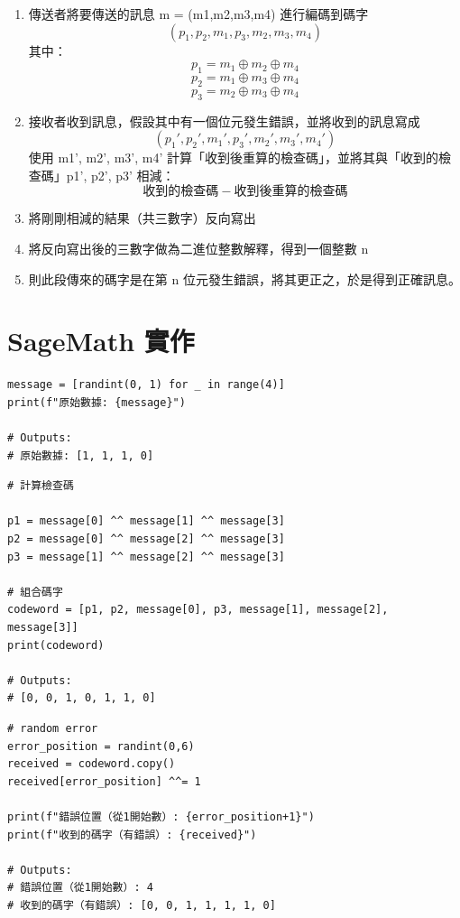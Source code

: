\documentclass[
]{article}
\providecommand{\tightlist}{%
  \setlength{\itemsep}{0pt}\setlength{\parskip}{0pt}}
\begin{document}
\begin{enumerate}
\def\labelenumi{\arabic{enumi}.}
\setcounter{enumi}{-1}
\tightlist
\item
  傳送者將要傳送的訊息 m = (m1,m2,m3,m4) 進行編碼到碼字 \[
  (p_{1},p_{2},m_{1},p_{3},m_{2},m_{3},m_{4})
  \] 其中： \[
  p_{1} = m_{1}\oplus m_{2}\oplus m_{4}
  \] \[
  p_{2} = m_{1}\oplus m_{3}\oplus m_{4}
  \] \[
  p_{3} = m_{2}\oplus m_{3}\oplus m_{4}
  \]
\item
  接收者收到訊息，假設其中有一個位元發生錯誤，並將收到的訊息寫成 \[
  (p_{1}',p_{2}',m_{1}',p_{3}',m_{2}',m_{3}',m_{4}')
  \] 使用 m1', m2', m3', m4'
  計算「收到後重算的檢查碼」，並將其與「收到的檢查碼」p1', p2', p3'
  相減： \[
  收到的檢查碼 - 收到後重算的檢查碼 
  \]
\item
  將剛剛相減的結果（共三數字）反向寫出
\item
  將反向寫出後的三數字做為二進位整數解釋，得到一個整數 n
\item
  則此段傳來的碼字是在第 n 位元發生錯誤，將其更正之，於是得到正確訊息。
\end{enumerate}

\hypertarget{sagemath-ux5be6ux4f5c}{%
\section{SageMath 實作}\label{sagemath-ux5be6ux4f5c}}

\begin{verbatim}
message = [randint(0, 1) for _ in range(4)]
print(f"原始數據: {message}")
 
# Outputs:
# 原始數據: [1, 1, 1, 0]
\end{verbatim}

\begin{verbatim}
# 計算檢查碼

p1 = message[0] ^^ message[1] ^^ message[3]
p2 = message[0] ^^ message[2] ^^ message[3]
p3 = message[1] ^^ message[2] ^^ message[3]

# 組合碼字
codeword = [p1, p2, message[0], p3, message[1], message[2], message[3]]
print(codeword)

# Outputs:
# [0, 0, 1, 0, 1, 1, 0]
\end{verbatim}

\begin{verbatim}
# random error
error_position = randint(0,6)
received = codeword.copy()
received[error_position] ^^= 1

print(f"錯誤位置（從1開始數）: {error_position+1}")
print(f"收到的碼字（有錯誤）: {received}")

# Outputs:
# 錯誤位置（從1開始數）: 4
# 收到的碼字（有錯誤）: [0, 0, 1, 1, 1, 1, 0]
\end{verbatim}
\end{document}
